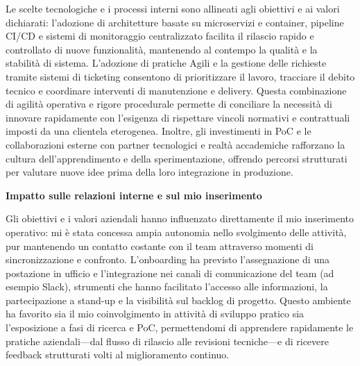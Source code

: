Le scelte tecnologiche e i processi interni sono allineati agli obiettivi e ai valori dichiarati: l'adozione di architetture basate su microservizi e container, 
pipeline CI/CD e sistemi di monitoraggio centralizzato facilita il rilascio rapido e controllato di nuove funzionalità, mantenendo al contempo la qualità e la stabilità di sistema. 
L'adozione di pratiche Agili e la gestione delle richieste tramite sistemi di ticketing consentono di prioritizzare il lavoro, tracciare il debito tecnico e coordinare interventi 
di manutenzione e delivery. Questa combinazione di agilità operativa e rigore procedurale permette di conciliare la necessità di innovare rapidamente con l'esigenza di rispettare 
vincoli normativi e contrattuali imposti da una clientela eterogenea. Inoltre, gli investimenti in PoC e le collaborazioni esterne con partner tecnologici e realtà accademiche 
rafforzano la cultura dell'apprendimento e della sperimentazione, offrendo percorsi strutturati per valutare nuove idee prima della loro integrazione in produzione.

\medskip
\noindent\textbf{Impatto sulle relazioni interne e sul mio inserimento}

Gli obiettivi e i valori aziendali hanno influenzato direttamente il mio inserimento operativo: mi è stata concessa ampia autonomia nello svolgimento delle attività, 
pur mantenendo un contatto costante con il team attraverso momenti di sincronizzazione e confronto. L'onboarding ha previsto l'assegnazione di una postazione in ufficio e 
l'integrazione nei canali di comunicazione del team (ad esempio Slack), strumenti che hanno facilitato l'accesso alle informazioni, la partecipazione a stand-up e la 
visibilità sul backlog di progetto. Questo ambiente ha favorito sia il mio coinvolgimento in attività di sviluppo pratico sia l'esposizione a fasi di ricerca e PoC, 
permettendomi di apprendere rapidamente le pratiche aziendali—dal flusso di rilascio alle revisioni tecniche—e di ricevere feedback strutturati volti al miglioramento continuo.




